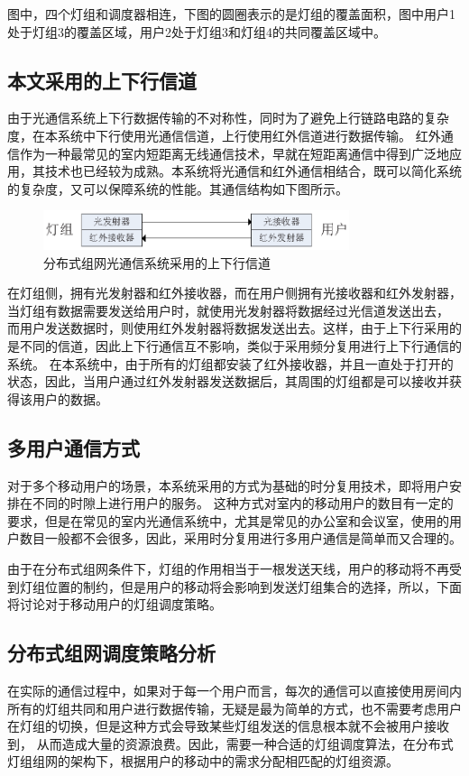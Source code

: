 图中，四个灯组和调度器相连，下图的圆圈表示的是灯组的覆盖面积，图中用户1处于灯组3的覆盖区域，用户2处于灯组3和灯组4的共同覆盖区域中。

\subsection{本文采用的上下行信道}
由于光通信系统上下行数据传输的不对称性，同时为了避免上行链路电路的复杂度，在本系统中下行使用光通信信道，上行使用红外信道进行数据传输。
红外通信作为一种最常见的室内短距离无线通信技术，早就在短距离通信中得到广泛地应用，其技术也已经较为成熟。本系统将光通信和红外通信相结合，既可以简化系统的复杂度，又可以保障系统的性能。其通信结构如下图所示。

\begin{figure}[htbp]
    \centering
	\includegraphics[width=0.8\textwidth]{figures/chapter-4/DistributionChannel.eps}
	\caption{分布式组网光通信系统采用的上下行信道}
	\label{fig:distribution-channel}
\end{figure}

在灯组侧，拥有光发射器和红外接收器，而在用户侧拥有光接收器和红外发射器，当灯组有数据需要发送给用户时，就使用光发射器将数据经过光信道发送出去，
而用户发送数据时，则使用红外发射器将数据发送出去。这样，由于上下行采用的是不同的信道，因此上下行通信互不影响，类似于采用频分复用进行上下行通信的系统。
在本系统中，由于所有的灯组都安装了红外接收器，并且一直处于打开的状态，因此，当用户通过红外发射器发送数据后，其周围的灯组都是可以接收并获得该用户的数据。

\subsection{多用户通信方式}
对于多个移动用户的场景，本系统采用的方式为基础的时分复用技术，即将用户安排在不同的时隙上进行用户的服务。
这种方式对室内的移动用户的数目有一定的要求，但是在常见的室内光通信系统中，尤其是常见的办公室和会议室，使用的用户数目一般都不会很多，因此，采用时分复用进行多用户通信是简单而又合理的。

由于在分布式组网条件下，灯组的作用相当于一根发送天线，用户的移动将不再受到灯组位置的制约，但是用户的移动将会影响到发送灯组集合的选择，所以，下面将讨论对于移动用户的灯组调度策略。

\subsection{分布式组网调度策略分析}
在实际的通信过程中，如果对于每一个用户而言，每次的通信可以直接使用房间内所有的灯组共同和用户进行数据传输，无疑是最为简单的方式，也不需要考虑用户在灯组的切换，但是这种方式会导致某些灯组发送的信息根本就不会被用户接收到，
从而造成大量的资源浪费。因此，需要一种合适的灯组调度算法，在分布式灯组组网的架构下，根据用户的移动中的需求分配相匹配的灯组资源。

